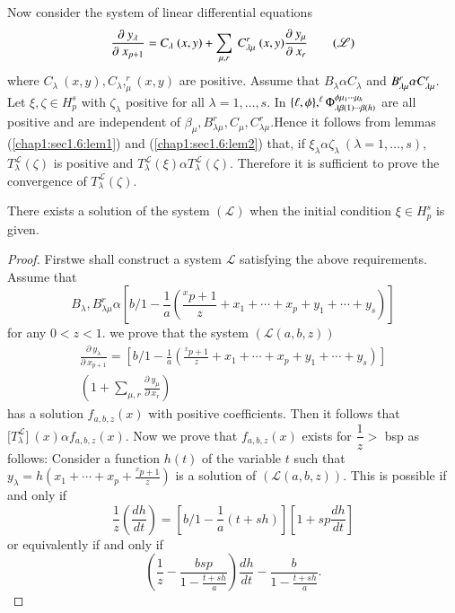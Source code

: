 Now consider the system of linear differential equations
\begin{equation}
  \frac{\partial ~ y_\lambda}{\partial ~ x_{p+1}} = C_\lambda ~ (x, y)
  + \sum_{\mu, r} ~ C^r_{\lambda\mu} ~ (x, y) \frac{\partial ~
    y_\mu}{\partial ~ x_r} \tag{$\mathscr{L}$} 
\end{equation}
where $C_\lambda ~ (x, y),  C_\lambda,  ^r_\mu(x, y)$ are
positive. Assume that $B_\lambda \alpha C_\lambda$ and $B^r_{\lambda
  \mu}\break  \alpha
C^r_{\lambda\mu}$. Let $\xi,  \zeta \in H^s_p$ with $\zeta_\lambda$
positive for all $\lambda= 1,  \ldots,  s$. In $\{ \ell,  \phi\},
^\ell\break \Phi^{\phi\mu_1 \cdots \mu_h}_{\lambda\beta(1) \cdots
  \beta(h)}$ are all positive and are independent of $\beta_\mu,
B^r_{\lambda\mu},  C_\mu,  C^r_{\lambda\mu}$.\break Hence it follows from
lemmas (\ref{chap1:sec1.6:lem1}) and (\ref{chap1:sec1.6:lem2}) that,  if $\xi_\lambda \alpha \zeta_\lambda ~
(\lambda = 1,  \ldots,  s)$, $T^{\mathscr{L}}_\lambda (\zeta)$ is
positive and $T^{\mathscr{L}}_\lambda (\xi) \alpha T^{\mathscr{L}}_\lambda
(\zeta)$. Therefore it is 
sufficient to prove the convergence of
$T^{\mathscr{L}}_\lambda(\zeta)$. 

\begin{lemma}\label{chap1:sec1.6:lem3}%
  There exists a solution of the system $(\mathscr{L})$ when the
  initial condition $\xi \in H^s_p$ is given. 
\end{lemma}

\begin{proof}%
  First\pageoriginale we shall construct a system $\mathscr{L}$ satisfying the above
  requirements. Assume that  
  $$
  B_\lambda,  B^r_{\lambda\mu} \alpha \left[  b \Big/ 1 - \frac{1}{a}
    \left(\frac{^x p+1}{z} + x_1 + \cdots + x_p + y_1 + \cdots +
    y_s\right)\right] 
  $$
  for any $0 < z < 1$. we prove that the system $(\mathscr{L}(a, b, z))$
  \begin{multline*}
  \frac{\partial ~ y_\lambda}{\partial ~ x_{p+1}} = \left[  b \Big/ 1 -
    \frac{1}{a} \left(\frac{^x p+1}{z} + x_1 + \cdots + x_p + y_1 + \cdots
    + y_s\right)\right]\\ 
  \left(1 + \sum_{\mu, r} \frac{\partial ~ y_\mu}{\partial
    ~ x_r}\right) 
  \end{multline*}
 has a solution $f_{a, b, z}(x)$ with positive coefficients. Then it
 follows that $\Big[ T^{\mathscr{L}}_\lambda\Big] ~ (x) \alpha f_{a, b,
   z}(x)$. Now we prove that $f_{a, b, z}(x)$ exists for $\dfrac{1}{z}
 > $ bsp as follows: Consider a function $h(t)$ of the variable $t$
 such that $y_\lambda = h(x_1 + \cdots + x_p + \frac{^x p+1}{z})$ is a
 solution of  $(\mathscr{L}(a, b, z))$. This is possible if and only
 if 
 $$
 \frac{1}{z} \left( \frac{dh}{dt}\right)  = \left[ b \Big/ 1 - \frac{1}{a}
   (t + sh)\right] \left[  1 + sp \frac{dh}{dt}\right] 
 $$
 or equivalently if and only if 
 $$
 \left(  \frac{1}{z} - \frac{bsp}{1- \frac{t + sh}{a}}\right)
 \frac{dh}{dt} - \frac{b}{1- \frac{t + sh}{a}}. 
 $$
\end{proof}

